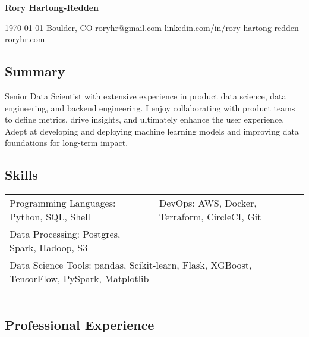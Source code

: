 \documentclass[10pt,letterpaper]{article}
\newenvironment{indentsection}[1]
{\begin{list}{}%
	{\setlength{\leftmargin}{#1}}
	\item[]%
}
{\end{list}}
\begin{document}
{\raggedright \LARGE \bf Rory Hartong-Redden}

{\raggedleft 
\today \/ \textbar
\/ Boulder, CO \textbar
\/ roryhr@gmail.com \textbar
\/ linkedin.com/in/rory-hartong-redden \textbar
\/ roryhr.com
\\
}


\subsection*{Summary}
\begin{centering}
Senior Data Scientist with extensive experience in product data science, data engineering, and backend engineering.
I enjoy collaborating with product teams to define metrics, drive insights, and ultimately enhance the user experience.
Adept at developing and deploying machine learning models and improving data foundations for long-term impact.
\end{centering}

\subsection*{Skills}
\begin{indentsection}{\parindent}
\begin{tabular}{p{0.5\linewidth}   p{0.5\linewidth}} 
	Programming Languages: Python, SQL, Shell
	& DevOps: AWS, Docker, Terraform, CircleCI, Git \\

	Data Processing: Postgres, Spark, Hadoop, S3  \\ 	
	\multicolumn{2}{l}{
		Data Science Tools: pandas, Scikit-learn, Flask, XGBoost, TensorFlow, PySpark, Matplotlib
		}
\end{tabular}
\end{indentsection}

\hrule
\subsection*{Professional Experience}
\end{document}
